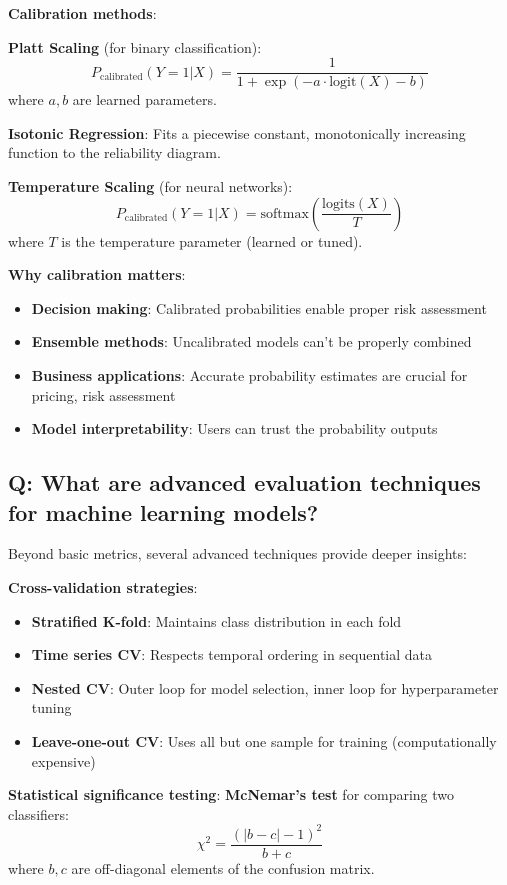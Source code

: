 \textbf{Calibration methods}:

\textbf{Platt Scaling} (for binary classification):
\[
P_{\text{calibrated}}(Y=1|X) = \frac{1}{1 + \exp(-a \cdot \text{logit}(X) - b)}
\]
where \(a, b\) are learned parameters.

\textbf{Isotonic Regression}:
Fits a piecewise constant, monotonically increasing function to the reliability diagram.

\textbf{Temperature Scaling} (for neural networks):
\[
P_{\text{calibrated}}(Y=1|X) = \text{softmax}\left(\frac{\text{logits}(X)}{T}\right)
\]
where \(T\) is the temperature parameter (learned or tuned).

\textbf{Why calibration matters}:
\begin{itemize}
	\item \textbf{Decision making}: Calibrated probabilities enable proper risk assessment
	\item \textbf{Ensemble methods}: Uncalibrated models can't be properly combined
	\item \textbf{Business applications}: Accurate probability estimates are crucial for pricing, risk assessment
	\item \textbf{Model interpretability}: Users can trust the probability outputs
\end{itemize}

\subsection*{Q: What are advanced evaluation techniques for machine learning models?}
Beyond basic metrics, several advanced techniques provide deeper insights:

\textbf{Cross-validation strategies}:
\begin{itemize}
	\item \textbf{Stratified K-fold}: Maintains class distribution in each fold
	\item \textbf{Time series CV}: Respects temporal ordering in sequential data
	\item \textbf{Nested CV}: Outer loop for model selection, inner loop for hyperparameter tuning
	\item \textbf{Leave-one-out CV}: Uses all but one sample for training (computationally expensive)
\end{itemize}

\textbf{Statistical significance testing}:
\textbf{McNemar's test} for comparing two classifiers:
\[
\chi^2 = \frac{(|b - c| - 1)^2}{b + c}
\]
where \(b, c\) are off-diagonal elements of the confusion matrix.

